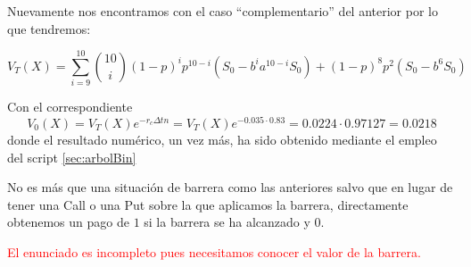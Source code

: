 \begin{problem}[2]
\spart

Nuevamente nos encontramos con el caso ``complementario'' del anterior por lo que tendremos:

\[V_T(X) = \sum_{i=9}^{10}{10 \choose i}(1-p)^ip^{10-i}(S_0-b^{i}a^{10-i}S_0)+(1-p)^8p^2(S_0-b^6S_0)\]

Con el correspondiente
\[V_0(X)=V_T(X)e^{-r_cΔtn}=V_T(X)e^{-0.035\cdot 0.83} = 0.0224 \cdot 0.97127 = 0.0218\]
donde el resultado numérico, un vez más, ha sido obtenido mediante el empleo del script \ref{sec:arbolBin}

\spart

No es más que una situación de barrera como las anteriores salvo que en lugar de tener una Call o una Put sobre la que aplicamos la barrera, directamente obtenemos un pago de $1$ si la barrera se ha alcanzado y $0$.

\textcolor{red}{El enunciado es incompleto pues necesitamos conocer el valor de la barrera.}

\end{problem}


